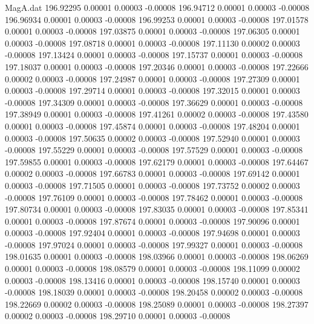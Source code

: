 \begin{filecontents}{MagA.dat}
 196.92295    0.00001    0.00003   -0.00008
 196.94712    0.00001    0.00003   -0.00008
 196.96934    0.00001    0.00003   -0.00008
 196.99253    0.00001    0.00003   -0.00008
 197.01578    0.00001    0.00003   -0.00008
 197.03875    0.00001    0.00003   -0.00008
 197.06305    0.00001    0.00003   -0.00008
 197.08718    0.00001    0.00003   -0.00008
 197.11130    0.00002    0.00003   -0.00008
 197.13424    0.00001    0.00003   -0.00008
 197.15737    0.00001    0.00003   -0.00008
 197.18037    0.00001    0.00003   -0.00008
 197.20346    0.00001    0.00003   -0.00008
 197.22666    0.00002    0.00003   -0.00008
 197.24987    0.00001    0.00003   -0.00008
 197.27309    0.00001    0.00003   -0.00008
 197.29714    0.00001    0.00003   -0.00008
 197.32015    0.00001    0.00003   -0.00008
 197.34309    0.00001    0.00003   -0.00008
 197.36629    0.00001    0.00003   -0.00008
 197.38949    0.00001    0.00003   -0.00008
 197.41261    0.00002    0.00003   -0.00008
 197.43580    0.00001    0.00003   -0.00008
 197.45874    0.00001    0.00003   -0.00008
 197.48204    0.00001    0.00003   -0.00008
 197.50635    0.00002    0.00003   -0.00008
 197.52940    0.00001    0.00003   -0.00008
 197.55229    0.00001    0.00003   -0.00008
 197.57529    0.00001    0.00003   -0.00008
 197.59855    0.00001    0.00003   -0.00008
 197.62179    0.00001    0.00003   -0.00008
 197.64467    0.00002    0.00003   -0.00008
 197.66783    0.00001    0.00003   -0.00008
 197.69142    0.00001    0.00003   -0.00008
 197.71505    0.00001    0.00003   -0.00008
 197.73752    0.00002    0.00003   -0.00008
 197.76109    0.00001    0.00003   -0.00008
 197.78462    0.00001    0.00003   -0.00008
 197.80734    0.00001    0.00003   -0.00008
 197.83035    0.00001    0.00003   -0.00008
 197.85341    0.00001    0.00003   -0.00008
 197.87674    0.00001    0.00003   -0.00008
 197.90096    0.00001    0.00003   -0.00008
 197.92404    0.00001    0.00003   -0.00008
 197.94698    0.00001    0.00003   -0.00008
 197.97024    0.00001    0.00003   -0.00008
 197.99327    0.00001    0.00003   -0.00008
 198.01635    0.00001    0.00003   -0.00008
 198.03966    0.00001    0.00003   -0.00008
 198.06269    0.00001    0.00003   -0.00008
 198.08579    0.00001    0.00003   -0.00008
 198.11099    0.00002    0.00003   -0.00008
 198.13416    0.00001    0.00003   -0.00008
 198.15740    0.00001    0.00003   -0.00008
 198.18039    0.00001    0.00003   -0.00008
 198.20458    0.00002    0.00003   -0.00008
 198.22669    0.00002    0.00003   -0.00008
 198.25089    0.00001    0.00003   -0.00008
 198.27397    0.00002    0.00003   -0.00008
 198.29710    0.00001    0.00003   -0.00008

\end{filecontents}
